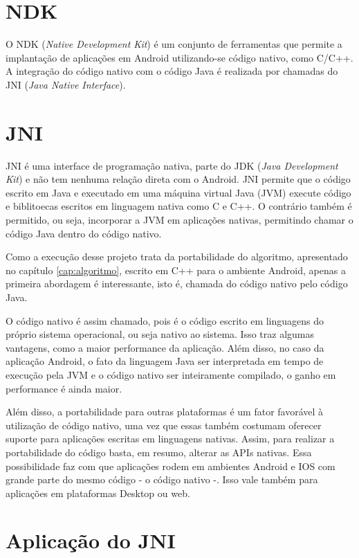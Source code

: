 \section{NDK}\label{sec:ndk}

O NDK (\textit{Native Development Kit}) é um conjunto de ferramentas que permite a implantação de aplicações em Android utilizando-se código nativo, como C/C++. A integração do código nativo com o código Java é realizada por chamadas do JNI (\textit{Java Native Interface}).

\section{JNI}\label{sec:jni}

JNI é uma interface de programação nativa, parte do JDK (\textit{Java Development Kit}) e não tem nenhuma relação direta com o Android. JNI permite que o código escrito em Java e executado em uma máquina virtual Java (JVM) execute código e biblitoecas escritos em linguagem nativa como C e C++. O contrário também é permitido, ou seja, incorporar a JVM em aplicações nativas, permitindo chamar o código Java dentro do código nativo.

Como a execução desse projeto trata da portabilidade do algoritmo, apresentado no capítulo \ref{cap:algoritmo}, escrito em C++ para o ambiente Android, apenas a primeira abordagem é interessante, isto é, chamada do código nativo pelo código Java.

O código nativo é assim chamado, pois é o código escrito em linguagens do próprio sistema operacional, ou seja nativo ao sistema. Isso traz algumas vantagens, como a maior performance da aplicação. Além disso, no caso da aplicação Android, o fato da linguagem Java ser interpretada em tempo de execução pela JVM e o código nativo ser inteiramente compilado, o ganho em performance é ainda maior.

Além disso, a portabilidade para outras plataformas é um fator favorável à utilização de código nativo, uma vez que essas também costumam oferecer suporte para aplicações escritas em linguagens nativas. Assim, para realizar a portabilidade do código basta, em resumo, alterar as APIs nativas. Essa possibilidade faz com que aplicações rodem em ambientes Android e IOS com grande parte do mesmo código - o código nativo -. Isso vale também para aplicações em plataformas Desktop ou web.

\section{Aplicação do JNI}\label{sec:aplicacaojni}

